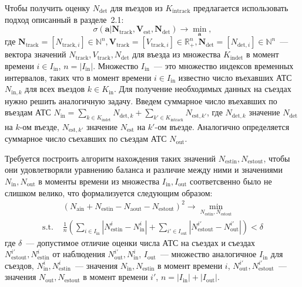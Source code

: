 Чтобы получить оценку $N_\text{det}$ для въездов из $K_\text{intrack}$ предлагается использовать подход описанный в разделе~2.1:
\[
    \sigma(\mathbf{a}|\mathbf{N}_\text{track}, \mathbf{V}_\text{est}, \mathbf{N}_\text{det}) \rightarrow \min_{\mathbf{a}},
\]
где $\mathbf{N}_\text{track} = [N_{\text{track}, i}] \in \mathbb{N}^{n}, \mathbf{V}_\text{track} = [V_{\text{track}, i}] \in \mathbb{R}_{+}^{n}, \mathbf{N}_\text{det} = [N_{\text{det}, i}] \in \mathbb{N}^{n}$~--- вектора значений $N_\text{track}, V_\text{track}, N_\text{det}$ для въезда из множества $K_\text{indet}$ в момент времени $i \in I_\text{in}$, $n = |I_\text{in}|$.
Множество $I_\text{in}$~--- это множество индексов временных интервалов, таких что в момент времени $i\in I_\text{in}$ известно число въехавших АТС $N_{\text{in}, k}$ для всех въездов $k \in K_\text{in}$.
Для получение необходимых данных на съездах нужно решить аналогичную задачу.
Введем суммарное число въехавших по въездам АТС $N_\text{in} = \sum\limits_{k\in K_\text{indet}} N_{\text{det}, k} + \sum\limits_{k'\in K_\text{intrack}} N_{\text{est}, k'}$, где $N_{\text{det}, k}$ значение $N_\text{det}$ на $k$-ом въезде, $N_{\text{est}, k'}$ значение $N_\text{est}$ на $k'$-ом въезде.
Аналогично определяется суммарное число съехавших по съездам АТС $N_\text{out}$.

Требуется построить алгоритм нахождения таких значений $N_\text{estin}, N_\text{estout}$, чтобы они удовлетворяли уравнению баланса и различие между ними и значениями $N_\text{in}, N_\text{out}$ в моменты времени из множества $I_\text{in}, I_\text{out}$ соответсвенно было не слишком велико, что формализуется следующим образом:
\begin{equation}
\begin{split}
    & (N_\text{ain} + N_\text{estin} - N_\text{aout} - N_\text{estout})^2 \rightarrow \min_{N_\text{estin}, N_\text{estout}}\\
    \text{s.t. } & \frac{1}{n} \left(\sum\limits_{i\in I_\text{in}} |N^i_\text{estin} - N^i_\text{in}| + \sum\limits_{i'\in I_\text{out}}|N^{i'}_\text{estout} - N^{i'}_\text{out}|\right) < \delta
\end{split}
\label{eq::in_out_quest}
\end{equation}
где $\delta$~--- допустимое отличие оценки числа АТС на съездах и съездах $N^{i'}_\text{estout}, N^{i}_\text{estin}$ от наблюдения $N^{i'}_\text{out}, N^{i}_\text{in}$, $I_{\text{out}}$~--- множество аналогичное $I_{\text{in}}$ для съездов, $N^i_{\text{in}}, N^i_{\text{estin}}$~--- значения $N_\text{in}, N_\text{estin}$ в момент времени $i$, $N^{i'}_{\text{out}}, N^{i'}_{\text{estout}}$~--- значения $N_\text{out}, N_\text{estout}$ в момент времени $i'$, $n = |I_\text{in}| + |I_\text{out}|$.


